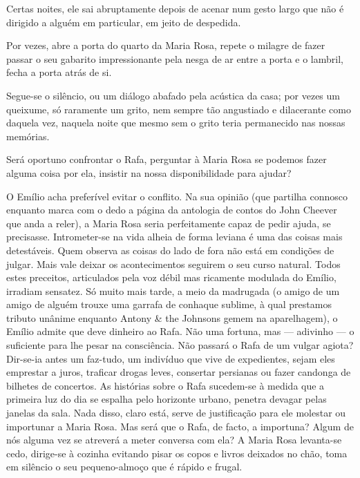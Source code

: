 Certas noites, ele sai abruptamente depois de acenar num gesto largo que
não é dirigido a alguém em particular, em jeito de despedida.

Por vezes, abre a porta do quarto da Maria Rosa, repete o milagre de
fazer passar o seu gabarito impressionante pela nesga de ar entre a
porta e o lambril, fecha a porta atrás de si.

Segue-se o silêncio, ou um diálogo abafado pela acústica da casa; por
vezes um queixume, só raramente um grito, nem sempre tão angustiado e
dilacerante como daquela vez, naquela noite que mesmo sem o grito
teria permanecido nas nossas memórias.

Será oportuno confrontar o Rafa, perguntar à Maria Rosa se podemos fazer
alguma coisa por ela, insistir na nossa disponibilidade para ajudar?

O Emílio acha preferível evitar o conflito. Na sua opinião (que
partilha connosco enquanto marca com o dedo a página da antologia de
contos do John Cheever que anda a reler), a Maria Rosa seria
perfeitamente capaz de pedir ajuda, se precisasse. Intrometer-se na vida
alheia de forma leviana é uma das coisas mais detestáveis. Quem observa
as coisas do lado de fora não está em condições de julgar. Mais vale
deixar os acontecimentos seguirem o seu curso natural. Todos estes
preceitos, articulados pela voz débil mas ricamente modulada do
Emílio, irradiam sensatez. Só muito mais tarde, a meio da madrugada (o
amigo de um amigo de alguém trouxe uma garrafa de conhaque sublime, à
qual prestamos tributo unânime enquanto Antony \& the Johnsons gemem
na aparelhagem), o Emílio admite que deve dinheiro ao Rafa. Não uma
fortuna, mas --- adivinho --- o suficiente para lhe pesar na
consciência. Não passará o Rafa de um vulgar agiota? Dir-se-ia antes um
faz-tudo, um indivíduo
que vive de expedientes, sejam eles emprestar a juros, traficar drogas
leves, consertar persianas ou fazer candonga de bilhetes de concertos.
As histórias sobre o Rafa sucedem-se à medida que a primeira luz do dia
se espalha pelo horizonte urbano, penetra devagar pelas janelas da sala.
Nada disso, claro está, serve de justificação para ele molestar ou
importunar a Maria Rosa. Mas será que o Rafa, de facto, a importuna?
Algum de nós alguma vez se atreverá a meter conversa com ela? A Maria
Rosa levanta-se cedo, dirige-se à cozinha evitando pisar os copos e
livros deixados no chão, toma em silêncio o seu pequeno-almoço que é
rápido e frugal.


\medskip
\asterisc
\medskip

